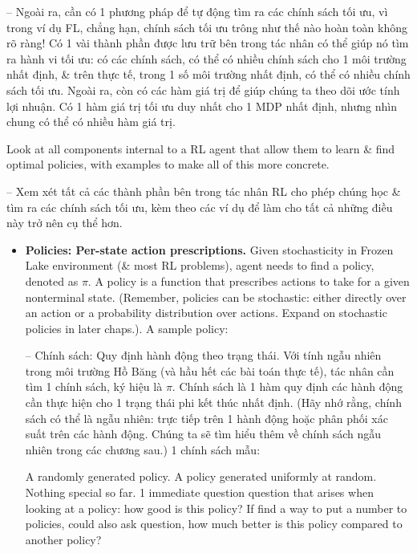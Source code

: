 \documentclass{article}
\begin{document}
\begin{itemize}
\begin{itemize}
        -- Ngoài ra, cần có 1 phương pháp để tự động tìm ra các chính sách tối ưu, vì trong ví dụ FL, chẳng hạn, chính sách tối ưu trông như thế nào hoàn toàn không rõ ràng! Có 1 vài thành phần được lưu trữ bên trong tác nhân có thể giúp nó tìm ra hành vi tối ưu: có các chính sách, có thể có nhiều chính sách cho 1 môi trường nhất định, \& trên thực tế, trong 1 số môi trường nhất định, có thể có nhiều chính sách tối ưu. Ngoài ra, còn có các hàm giá trị để giúp chúng ta theo dõi ước tính lợi nhuận. Có 1 hàm giá trị tối ưu duy nhất cho 1 MDP nhất định, nhưng nhìn chung có thể có nhiều hàm giá trị.

        Look at all components internal to a RL agent that allow them to learn \& find optimal policies, with examples to make all of this more concrete.

        -- Xem xét tất cả các thành phần bên trong tác nhân RL cho phép chúng học \& tìm ra các chính sách tối ưu, kèm theo các ví dụ để làm cho tất cả những điều này trở nên cụ thể hơn.
        \begin{itemize}
            \item {\bf Policies: Per-state action prescriptions.} Given stochasticity in Frozen Lake environment (\& most RL problems), agent needs to find a policy, denoted as $\pi$. A policy is a function that prescribes actions to take for a given nonterminal state. (Remember, policies can be stochastic: either directly over an action or a probability distribution over actions. Expand on stochastic policies in later chaps.). A sample policy:

            -- {\sf Chính sách: Quy định hành động theo trạng thái.} Với tính ngẫu nhiên trong môi trường Hồ Băng (và hầu hết các bài toán thực tế), tác nhân cần tìm 1 chính sách, ký hiệu là $\pi$. Chính sách là 1 hàm quy định các hành động cần thực hiện cho 1 trạng thái phi kết thúc nhất định. (Hãy nhớ rằng, chính sách có thể là ngẫu nhiên: trực tiếp trên 1 hành động hoặc phân phối xác suất trên các hành động. Chúng ta sẽ tìm hiểu thêm về chính sách ngẫu nhiên trong các chương sau.) 1 chính sách mẫu:

            {\sf A randomly generated policy.} A policy generated uniformly at random. Nothing special so far. 1 immediate question question that arises when looking at a policy: how good is this policy? If find a way to put a number to policies, could also ask question, how much better is this policy compared to another policy?


\end{itemize}
\end{itemize}
\end{itemize}
\end{document}
